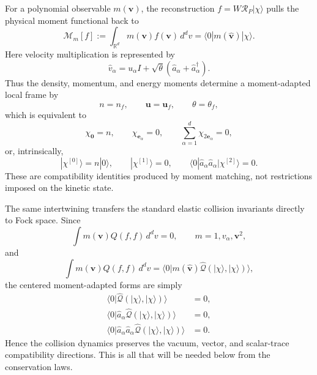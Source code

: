 \documentclass[11pt,oneside]{article}
\numberwithin{equation}{section}
\theoremstyle{definition}
\begin{document}
For a polynomial observable $m(\bm v)$, the reconstruction
$f=W\mathcal R_P|\chi\rangle$ pulls the physical moment functional back to
\begin{equation}
 \mathcal M_m[f]
 :=\int_{\mathbb R^d}m(\bm v)f(\bm v)\,d^dv
 =\langle0|m(\widehat{\bm v})|\chi\rangle.
\label{eq:maxwell_moment_intertwining}
\end{equation}
Here velocity multiplication is represented by
\begin{equation}
\widehat v_\alpha
=u_\alpha I+\sqrt\theta(\hat a_\alpha+\hat a_\alpha^\dagger).
\label{eq:maxwell_vhat}
\end{equation}
Thus the density, momentum, and energy moments determine a moment-adapted local frame by
\begin{equation}
 n=n_f,
 \qquad
 \bm u=\bm u_f,
 \qquad
 \theta=\theta_f,
\label{eq:maxwell_moment_adapted_frame_def}
\end{equation}
which is equivalent to
\begin{equation}
\chi_{\bm0}=n,
\qquad
\chi_{\bm e_\alpha}=0,
\qquad
\sum_{\alpha=1}^{d}\chi_{2\bm e_\alpha}=0,
\label{eq:maxwell_compatibility_chi}
\end{equation}
or, intrinsically,
\begin{equation}
 |\chi^{[0]}\rangle=n|0\rangle,
 \qquad
 |\chi^{[1]}\rangle=0,
 \qquad
 \langle0|\hat a_\alpha\hat a_\alpha|\chi^{[2]}\rangle=0.
\label{eq:maxwell_compatibility_graded}
\end{equation}
These are compatibility identities produced by moment matching, not restrictions imposed on the kinetic state.

The same intertwining transfers the standard elastic collision invariants directly to Fock space.  Since
\begin{equation}
 \int m(\bm v)Q(f,f)\,d^dv=0,
 \qquad m=1,v_\alpha,\bm v^2,
\label{eq:maxwell_physical_collision_invariants}
\end{equation}
and
\begin{equation}
 \int m(\bm v)Q(f,f)\,d^dv
 =\langle0|m(\widehat{\bm v})
 \widehat{\mathcal Q}(|\chi\rangle,|\chi\rangle)\rangle,
\label{eq:maxwell_collision_rate_intertwining}
\end{equation}
the centered moment-adapted forms are simply
\begin{equation}
\begin{aligned}
\langle0|\widehat{\mathcal Q}(|\chi\rangle,|\chi\rangle)\rangle&=0,\\
\langle0|\hat a_\alpha\widehat{\mathcal Q}(|\chi\rangle,|\chi\rangle)\rangle&=0,\\
\langle0|\hat a_\alpha\hat a_\alpha
\widehat{\mathcal Q}(|\chi\rangle,|\chi\rangle)\rangle&=0.
\end{aligned}
\label{eq:maxwell_collision_invariants_summary}
\end{equation}
Hence the collision dynamics preserves the vacuum, vector, and scalar-trace compatibility directions.  This is all that will be needed below from the conservation laws.
\end{document}
